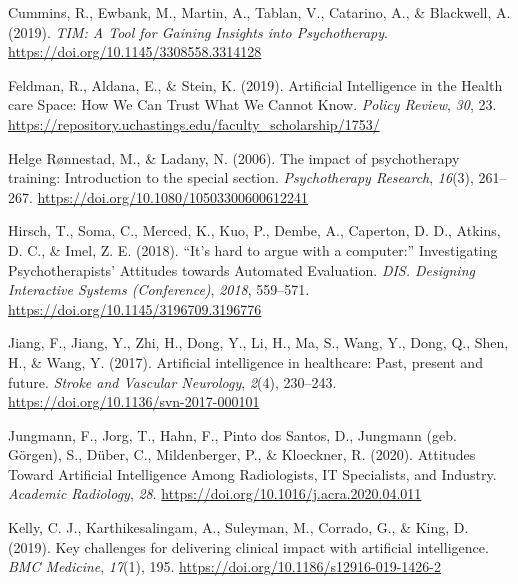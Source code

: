 \documentclass[
  man]{apa7}
\newlength{\cslhangindent}
\newlength{\cslentryspacingunit} %
\newenvironment{CSLReferences}[2] %
 {%
  \setlength{\parindent}{0pt}
  \ifodd #1
  \let\oldpar\par
  \def\par{\hangindent=\cslhangindent\oldpar}
  \fi
  \setlength{\parskip}{#2\cslentryspacingunit}
 }%
 {}
\begin{document}
\begin{CSLReferences}{1}{0}
\leavevmode{}%
Cummins, R., Ewbank, M., Martin, A., Tablan, V., Catarino, A., \& Blackwell, A. (2019). \emph{{TIM}: {A} {Tool} for {Gaining} {Insights} into {Psychotherapy}}. \url{https://doi.org/10.1145/3308558.3314128}

\leavevmode{}%
Feldman, R., Aldana, E., \& Stein, K. (2019). Artificial {Intelligence} in the {Health} care {Space}: {How} {We} {Can} {Trust} {What} {We} {Cannot} {Know}. \emph{Policy Review}, \emph{30}, 23. \url{https://repository.uchastings.edu/faculty_scholarship/1753/}

\leavevmode{}%
Helge Rønnestad, M., \& Ladany, N. (2006). The impact of psychotherapy training: {Introduction} to the special section. \emph{Psychotherapy Research}, \emph{16}(3), 261--267. \url{https://doi.org/10.1080/10503300600612241}

\leavevmode{}%
Hirsch, T., Soma, C., Merced, K., Kuo, P., Dembe, A., Caperton, D. D., Atkins, D. C., \& Imel, Z. E. (2018). {``{It}'s hard to argue with a computer:''} {Investigating} {Psychotherapists}' {Attitudes} towards {Automated} {Evaluation}. \emph{DIS. Designing Interactive Systems (Conference)}, \emph{2018}, 559--571. \url{https://doi.org/10.1145/3196709.3196776}

\leavevmode{}%
Jiang, F., Jiang, Y., Zhi, H., Dong, Y., Li, H., Ma, S., Wang, Y., Dong, Q., Shen, H., \& Wang, Y. (2017). Artificial intelligence in healthcare: Past, present and future. \emph{Stroke and Vascular Neurology}, \emph{2}(4), 230--243. \url{https://doi.org/10.1136/svn-2017-000101}

\leavevmode{}%
Jungmann, F., Jorg, T., Hahn, F., Pinto dos Santos, D., Jungmann (geb. Görgen), S., Düber, C., Mildenberger, P., \& Kloeckner, R. (2020). Attitudes {Toward} {Artificial} {Intelligence} {Among} {Radiologists}, {IT} {Specialists}, and {Industry}. \emph{Academic Radiology}, \emph{28}. \url{https://doi.org/10.1016/j.acra.2020.04.011}

\leavevmode{}%
Kelly, C. J., Karthikesalingam, A., Suleyman, M., Corrado, G., \& King, D. (2019). Key challenges for delivering clinical impact with artificial intelligence. \emph{BMC Medicine}, \emph{17}(1), 195. \url{https://doi.org/10.1186/s12916-019-1426-2}


\end{CSLReferences}
\end{document}
